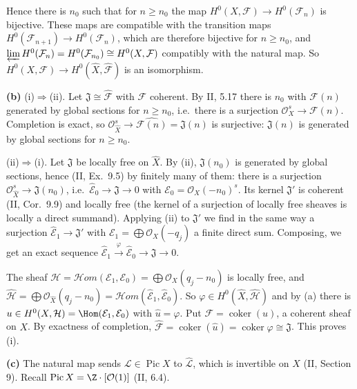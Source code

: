 \documentclass[11pt]{article}
\begin{document}
Hence there is $n_0$ such that for $n\ge n_0$ the map $H^0(X,\mathcal F)\to H^0(\mathcal F_n)$ is bijective. These maps are compatible with the transition maps $H^0(\mathcal F_{n+1})\to H^0(\mathcal F_n)$, which are therefore bijective for $n\ge n_0$, and $\varprojlim H^0(\mathcal F_n)=H^0(\mathcal F_{n_0})\cong H^0(X,\mathcal F)$ compatibly with the natural map. So $H^0(X,\mathcal F)\to H^0(\widehat X,\widehat{\mathcal F})$ is an isomorphism.

\medskip
\textbf{(b)} (i)$\Rightarrow$(ii). Let $\mathfrak J\cong\widehat{\mathcal F}$ with $\mathcal F$ coherent. By II, 5.17 there is $n_0$ with $\mathcal F(n)$ generated by global sections for $n\ge n_0$, i.e.\ there is a surjection $\mathcal O_X^s\to\mathcal F(n)$. Completion is exact, so $\mathcal O_{\widehat X}^s\to\widehat{\mathcal F(n)}=\mathfrak J(n)$ is surjective: $\mathfrak J(n)$ is generated by global sections for $n\ge n_0$.

(ii)$\Rightarrow$(i). Let $\mathfrak J$ be locally free on $\widehat X$. By (ii), $\mathfrak J(n_0)$ is generated by global sections, hence (II, Ex.~9.5) by finitely many of them: there is a surjection $\mathcal O_{\widehat X}^s\to\mathfrak J(n_0)$, i.e.\ $\widehat{\mathcal E}_0\to\mathfrak J\to0$ with $\mathcal E_0=\mathcal O_X(-n_0)^{s}$. Its kernel $\mathfrak J'$ is coherent (II, Cor.~9.9) and locally free (the kernel of a surjection of locally free sheaves is locally a direct summand). Applying (ii) to $\mathfrak J'$ we find in the same way a surjection $\widehat{\mathcal E}_1\to\mathfrak J'$ with $\mathcal E_1=\bigoplus\mathcal O_X(-q_j)$ a finite direct sum. Composing, we get an exact sequence $\widehat{\mathcal E}_1\xrightarrow{\varphi}\widehat{\mathcal E}_0\to\mathfrak J\to0$.

The sheaf $\mathcal H=\mathcal Hom(\mathcal E_1,\mathcal E_0)=\bigoplus\mathcal O_X(q_j-n_0)$ is locally free, and $\widehat{\mathcal H}=\bigoplus\mathcal O_{\widehat X}(q_j-n_0)=\mathcal Hom(\widehat{\mathcal E}_1,\widehat{\mathcal E}_0)$. So $\varphi\in H^0(\widehat X,\widehat{\mathcal H})$ and by (a) there is $u\in H^0(X,\mathcal H)=\Hom(\mathcal E_1,\mathcal E_0)$ with $\widehat u=\varphi$. Put $\mathcal F=\operatorname{coker}(u)$, a coherent sheaf on $X$. By exactness of completion, $\widehat{\mathcal F}=\operatorname{coker}(\widehat u)=\operatorname{coker}\varphi\cong\mathfrak J$. This proves (i).

\medskip
\textbf{(c)} The natural map sends $\mathcal L\in\operatorname{Pic}X$ to $\widehat{\mathcal L}$, which is invertible on $\widehat X$ (II, Section 9). Recall $\operatorname{Pic}X=\Z\cdot[\mathcal O(1)]$ (II, 6.4).
\end{document}
